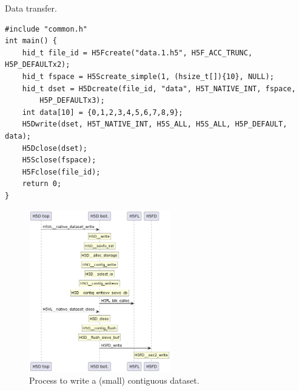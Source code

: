 \begin{listing}
\centering
\caption{Data transfer.}
\label{lst:dataset-transfer}
\begin{verbatim}
#include "common.h"
int main() {
    hid_t file_id = H5Fcreate("data.1.h5", H5F_ACC_TRUNC, H5P_DEFAULTx2);
    hid_t fspace = H5Screate_simple(1, (hsize_t[]){10}, NULL);
    hid_t dset = H5Dcreate(file_id, "data", H5T_NATIVE_INT, fspace,
        H5P_DEFAULTx3);
    int data[10] = {0,1,2,3,4,5,6,7,8,9};
    H5Dwrite(dset, H5T_NATIVE_INT, H5S_ALL, H5S_ALL, H5P_DEFAULT, data);
    H5Dclose(dset);
    H5Sclose(fspace);
    H5Fclose(file_id);
    return 0;
}
\end{verbatim}
\end{listing}

\begin{figure}
    \centering
    \includegraphics[width=0.55\textwidth]{images/tour_3_uml_dset_write.png}
    \caption{Process to write a (small) contiguous dataset.}
    \label{fig:tour-3-uml-dset-write-contig}
\end{figure}



